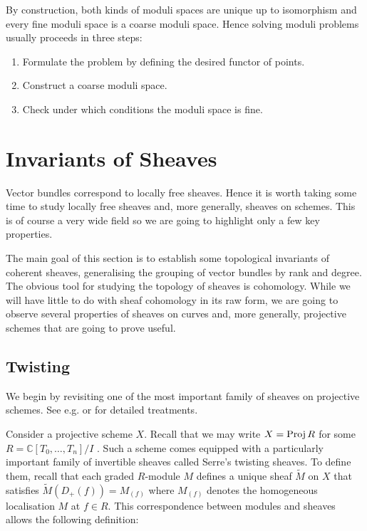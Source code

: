 \documentclass[12pt]{ociamthesis}  %
\begin{document}
By construction, both kinds of moduli spaces are unique up to
isomorphism and every fine moduli space is a coarse moduli
space. Hence solving moduli problems usually proceeds in
three steps:

\begin{enumerate}
  \item Formulate the problem by defining the desired functor of
        points.
  \item Construct a coarse moduli space.
  \item Check under which conditions the moduli space is fine.
\end{enumerate}

\section{Invariants of Sheaves}

Vector bundles correspond to locally free sheaves. Hence it is worth
taking some time to study locally free sheaves and, more generally,
sheaves on schemes. This is of course a very wide field
so we are going to highlight only a few key properties.

The main goal of this section is to establish some topological
invariants of coherent sheaves, generalising the grouping of
vector bundles by rank and degree. The obvious tool for studying
the topology of sheaves is cohomology. While we will have little
to do with sheaf cohomology in its raw form, we are going to
observe several properties of sheaves on curves and, more generally,
projective schemes that are going to prove useful.

\subsection{Twisting}

We begin by revisiting one of the most important family of sheaves
on projective schemes. See e.g. \cite{gortz2010} or
\cite{hartshorne1977} for detailed treatments.

Consider a projective scheme $X$. Recall that we may write
$X=\operatorname{Proj} R$ for some $R=\mathbb{C}[T_0,\ldots,T_n]/I$ \cite[II Corollary 5.16]{hartshorne1977}. Such a scheme comes
equipped with a particularly important family of invertible sheaves
called Serre's twisting sheaves. To define them, recall that each
graded $R$-module $M$ defines a unique sheaf $\tilde M$ on $X$
that satisfies $\tilde M (D_+(f)) = M_{(f)}$ where $M_{(f)}$
denotes the homogeneous localisation $M$ at $f\in R$. This
correspondence between modules and sheaves allows the following
definition:
\end{document}
